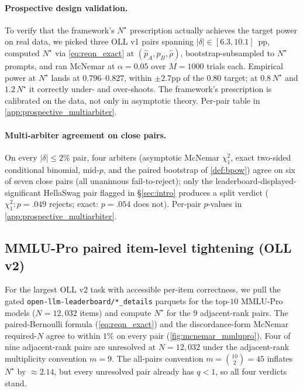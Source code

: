 \documentclass{article}
\theoremstyle{plain}
\theoremstyle{definition}
\begin{document}
\paragraph{Prospective design validation.} To verify that the framework's $N^{\star}$ prescription actually achieves the target power on real data, we picked three OLL v1 pairs spanning $|\delta| \in [6.3, 10.1]$~pp, computed $N^{\star}$ via \cref{eq:reqn_exact} at $(\hat p_A,\hat p_B,\hat\rho)$, bootstrap-subsampled to $N^{\star}$ prompts, and ran McNemar at $\alpha{=}0.05$ over $M{=}1000$ trials each. Empirical power at $N^{\star}$ lands at $0.796$--$0.827$, within $\pm 2.7$pp of the $0.80$ target; at $0.8\,N^{\star}$ and $1.2\,N^{\star}$ it correctly under- and over-shoots. The framework's prescription is calibrated on the data, not only in asymptotic theory. Per-pair table in \cref{app:prospective_multiarbiter}.

\paragraph{Multi-arbiter agreement on close pairs.} On every $|\delta|\leq 2\%$ pair, four arbiters (asymptotic McNemar $\chi^2_1$, exact two-sided conditional binomial, mid-$p$, and the paired bootstrap of \cref{def:bpow}) agree on six of seven close pairs (all unanimous fail-to-reject); only the leaderboard-displayed-significant HellaSwag pair flagged in \S\ref{sec:intro} produces a split verdict ($\chi^2_1\!:\!p{=}.049$ rejects; exact: $p{=}.054$ does not). Per-pair $p$-values in \cref{app:prospective_multiarbiter}.

\subsection{MMLU-Pro paired item-level tightening (OLL v2)}
\label{sec:resolution-mmlupro}

For the largest OLL v2 task with accessible per-item correctness, we pull the gated \texttt{open-llm-leaderboard/*\_details} parquets for the top-$10$ MMLU-Pro models ($N=12{,}032$ items) and compute $N^{\star}$ for the $9$ adjacent-rank pairs. The paired-Bernoulli formula (\cref{eq:reqn_exact}) and the discordance-form McNemar required-$N$ agree to within $1\%$ on every pair (\cref{fig:mcnemar_mmlupro}). Four of nine adjacent-rank pairs are unresolved at $N=12{,}032$ under the adjacent-rank multiplicity convention $m=9$. The all-pairs convention $m=\binom{10}{2}=45$ inflates $N^{\star}$ by ${\approx}2.14$, but every unresolved pair already has $q < 1$, so all four verdicts stand.
\end{document}
